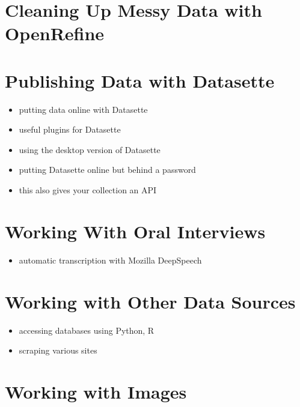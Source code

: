 \documentclass[
]{book}
\providecommand{\tightlist}{%
  \setlength{\itemsep}{0pt}\setlength{\parskip}{0pt}}
\begin{document}
\hypertarget{open-refine}{%
\section{Cleaning Up Messy Data with OpenRefine}\label{open-refine}}

\hypertarget{publishing}{%
\section{Publishing Data with Datasette}\label{publishing}}

\begin{itemize}
\tightlist
\item
  putting data online with Datasette
\item
  useful plugins for Datasette
\item
  using the desktop version of Datasette
\item
  putting Datasette online but behind a password
\item
  this also gives your collection an API
\end{itemize}

\hypertarget{oral-interviews}{%
\section{Working With Oral Interviews}\label{oral-interviews}}

\begin{itemize}
\tightlist
\item
  automatic transcription with Mozilla DeepSpeech
\end{itemize}

\hypertarget{open-data}{%
\section{Working with Other Data Sources}\label{open-data}}

\begin{itemize}
\tightlist
\item
  accessing databases using Python, R
\item
  scraping various sites
\end{itemize}

\hypertarget{images}{%
\section{Working with Images}\label{images}}
\end{document}
